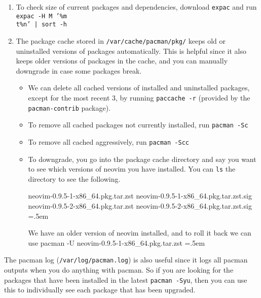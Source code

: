 \documentclass{article}
\newenvironment{cverbatim}
 {\SaveVerbatim{cverb}}
 {\endSaveVerbatim
  \flushleft\fboxrule=0pt\fboxsep=.5em
  \colorbox{cverbbg}{%
    \makebox[\dimexpr\linewidth-2\fboxsep][l]{\BUseVerbatim{cverb}}%
  }
  \endflushleft
}
\begin{document}
\begin{enumerate}
        \item To check size of current packages and dependencies, download \texttt{expac} and run \texttt{expac -H M '\%m \\t\%n' | sort -h} 

        \item The package cache stored in \texttt{/var/cache/pacman/pkg/} keeps old or uninstalled versions of packages automatically. This is helpful since it also keeps older versions of packages in the cache, and you can manually downgrade in case some packages break.  
        \begin{itemize}
          \item We can delete all cached versions of installed and uninstalled packages, except for the most recent 3, by running \texttt{paccache -r} (provided by the \texttt{pacman-contrib} package). 
          \item To remove all cached packages not currently installed, run \texttt{pacman -Sc}
          \item To remove all cached aggressively, run \texttt{pacman -Scc}
          \item To downgrade, you go into the package cache directory and say you want to see which versions of neovim you have installed. You can \texttt{ls} the directory to see the following. 
          
            \begin{cverbatim}
              neovim-0.9.5-1-x86_64.pkg.tar.zst
              neovim-0.9.5-1-x86_64.pkg.tar.zst.sig
              neovim-0.9.5-2-x86_64.pkg.tar.zst
              neovim-0.9.5-2-x86_64.pkg.tar.zst.sig
            \end{cverbatim}

            We have an older version of neovim installed, and to roll it back we can use 
            \begin{cverbatim} 
              pacman -U neovim-0.9.5-1-x86_64.pkg.tar.zst
            \end{cverbatim}
        \end{itemize} 
      \end{enumerate}

      The pacman log (\texttt{/var/log/pacman.log}) is also useful since it logs all pacman outputs when you do anything with pacman. So if you are looking for the packages that have been installed in the latest \texttt{pacman -Syu}, then you can use this to individually see each package that has been upgraded. 
\end{document}
